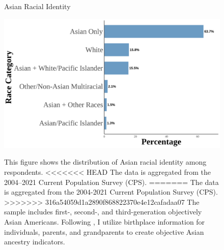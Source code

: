 \newpage
\pagebreak

\begin{center}
\begin{figure}[H]
\caption{Asian Racial Identity}
\includegraphics[width=\textwidth]{histogram_asian_american_race_aggregated.png} 
\label{fig:histogram-all}
\caption*{\footnotesize{This figure shows the distribution of Asian racial identity among respondents. 
<<<<<<< HEAD
The data is aggregated from the 2004--2021 Current Population Survey (CPS). 
=======
The data is aggregated from the 2004-2021 Current Population Survey (CPS). 
>>>>>>> 316a54059d1a2890f868822370e4e12cafadaa07
The sample includes first-, second-, and third-generation objectively Asian Americans.
Following \textcite{antmanEthnicAttritionObserved2016,antmanEthnicAttritionAssimilation2020}, 
I utilize birthplace information for individuals, parents, and grandparents to create objective Asian ancestry indicators.
}}
\end{figure}
\end{center}

\newpage
\pagebreak

